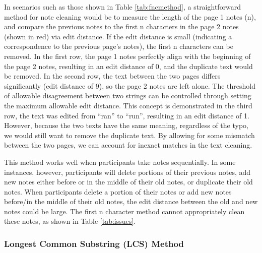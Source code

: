 \documentclass[print]{nuthesis}
\begin{document}
In scenarios such as those shown in Table \ref{tab:fncmethod}, a straightforward method for note cleaning would be to measure the length of the page 1 notes (n), and compare the previous notes to the first n characters in the page 2 notes (shown in red) via edit distance.
If the edit distance is small (indicating a correspondence to the previous page's notes), the first n characters can be removed.
In the first row, the page 1 notes perfectly align with the beginning of the page 2 notes, resulting in an edit distance of 0, and the duplicate text would be removed.
In the second row, the text between the two pages differs significantly (edit distance of 9), so the page 2 notes are left alone.
The threshold of allowable disagreement between two strings can be controlled through setting the maximum allowable edit distance.
This concept is demonstrated in the third row, the text was edited from ``ran'' to ``run'', resulting in an edit distance of 1.
However, because the two texts have the same meaning, regardless of the typo, we would still want to remove the duplicate text.
By allowing for some mismatch between the two pages, we can account for inexact matches in the text cleaning.

This method works well when participants take notes sequentially.
In some instances, however, participants will delete portions of their previous notes, add new notes either before or in the middle of their old notes, or duplicate their old notes.
When participants delete a portion of their notes or add new notes before/in the middle of their old notes, the edit distance between the old and new notes could be large.
The first n character method cannot appropriately clean these notes, as shown in Table \ref{tab:issues}.

\hypertarget{longest-common-substring-lcs-method}{%
\subsubsection{Longest Common Substring (LCS) Method}\label{longest-common-substring-lcs-method}}
\end{document}
